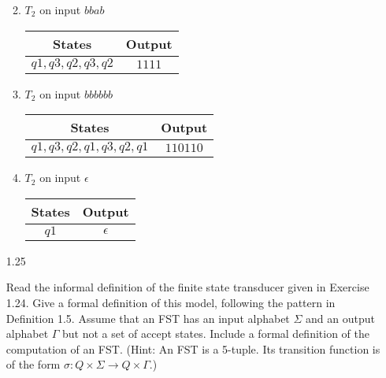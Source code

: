 \begin{enumerate}
\begin{enumerate}
\begin{table}[H]
                    \end{table}
              \item $T_2$ on input $bbab$
                    \begin{table}[H]
                        \centering
                        \begin{tabular}{|c|c|}
                            \hline
                            States           & Output \\
                            \hline
                            $q1,q3,q2,q3,q2$ & $1111$ \\
                            \hline
                        \end{tabular}
                    \end{table}
              \item $T_2$ on input $bbbbbb$
                    \begin{table}[H]
                        \centering
                        \begin{tabular}{|c|c|}
                            \hline
                            States                 & Output   \\
                            \hline
                            $q1,q3,q2,q1,q3,q2,q1$ & $110110$ \\
                            \hline
                        \end{tabular}
                    \end{table}
              \item $T_2$ on input $\epsilon$
                    \begin{table}[H]
                        \centering
                        \begin{tabular}{|c|c|}
                            \hline
                            States & Output     \\
                            \hline
                            $q1$   & $\epsilon$ \\
                            \hline
                        \end{tabular}
                    \end{table}
          \end{enumerate}
          
    \item [1.25]
          
          Read the informal definition of the finite state transducer given in Exercise 1.24. Give a formal definition of this model, following the pattern in Definition 1.5. Assume that an FST has an input alphabet $\Sigma$ and an output alphabet $\Gamma$ but not a set of accept states. Include a formal definition of the computation of an FST. (Hint: An FST is a 5-tuple. Its transition function is of the form $\sigma: Q \times \Sigma \longrightarrow Q \times \Gamma$.)
\end{enumerate}
